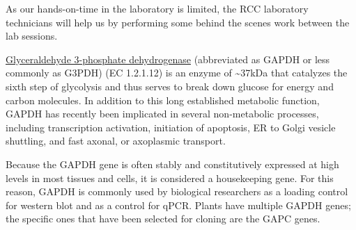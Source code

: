As our hands-on-time in the laboratory is limited, the RCC laboratory
technicians will help us by performing some behind the scenes work
between the lab sessions.

\href{https://en.wikipedia.org/wiki/Glyceraldehyde_3-phosphate_dehydrogenase}{Glyceraldehyde
3-phosphate dehydrogenase} (abbreviated as GAPDH or less commonly as
G3PDH) (EC 1.2.1.12) is an enzyme of \textasciitilde{}37kDa that
catalyzes the sixth step of glycolysis and thus serves to break down
glucose for energy and carbon molecules. In addition to this long
established metabolic function, GAPDH has recently been implicated in
several non-metabolic processes, including transcription activation,
initiation of apoptosis, ER to Golgi vesicle shuttling, and fast axonal,
or axoplasmic transport.

Because the GAPDH gene is often stably and constitutively expressed at
high levels in most tissues and cells, it is considered a housekeeping
gene. For this reason, GAPDH is commonly used by biological researchers
as a loading control for western blot and as a control for qPCR. Plants
have multiple GAPDH genes; the specific ones that have been selected for
cloning are the GAPC genes.
